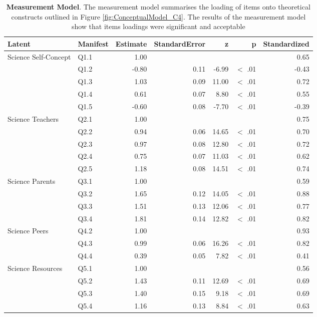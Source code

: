 \begin{landscape}
\begin{table}[ht]
\centering
\begin{tabular}{llrrrrr}
  \hline
Latent & Manifest & Estimate & StandardError & z & p & Standardized \\ 
  \hline
Science Self-Concept & Q1.1 & 1.00 &  &  &  & 0.65 \\ 
   & Q1.2 & -0.80 & 0.11 & -6.99 & $<$ .01 & -0.43 \\ 
   & Q1.3 & 1.03 & 0.09 & 11.00 & $<$ .01 & 0.72 \\ 
   & Q1.4 & 0.61 & 0.07 & 8.80 & $<$ .01 & 0.55 \\ 
   & Q1.5 & -0.60 & 0.08 & -7.70 & $<$ .01 & -0.39 \\ 
  Science Teachers & Q2.1 & 1.00 &  &  &  & 0.75 \\ 
   & Q2.2 & 0.94 & 0.06 & 14.65 & $<$ .01 & 0.70 \\ 
   & Q2.3 & 0.97 & 0.08 & 12.80 & $<$ .01 & 0.72 \\ 
   & Q2.4 & 0.75 & 0.07 & 11.03 & $<$ .01 & 0.62 \\ 
   & Q2.5 & 1.18 & 0.08 & 14.51 & $<$ .01 & 0.74 \\ 
  Science Parents & Q3.1 & 1.00 &  &  &  & 0.59 \\ 
   & Q3.2 & 1.65 & 0.12 & 14.05 & $<$ .01 & 0.88 \\ 
   & Q3.3 & 1.51 & 0.13 & 12.06 & $<$ .01 & 0.77 \\ 
   & Q3.4 & 1.81 & 0.14 & 12.82 & $<$ .01 & 0.82 \\ 
  Science Peers & Q4.2 & 1.00 &  &  &  & 0.93 \\ 
   & Q4.3 & 0.99 & 0.06 & 16.26 & $<$ .01 & 0.82 \\ 
   & Q4.4 & 0.39 & 0.05 & 7.82 & $<$ .01 & 0.41 \\ 
  Science Resources & Q5.1 & 1.00 &  &  &  & 0.56 \\ 
   & Q5.2 & 1.43 & 0.11 & 12.69 & $<$ .01 & 0.69 \\ 
   & Q5.3 & 1.40 & 0.15 & 9.18 & $<$ .01 & 0.69 \\ 
   & Q5.4 & 1.16 & 0.13 & 8.84 & $<$ .01 & 0.63 \\ 
   \hline
\end{tabular}
\caption{\textbf{Measurement Model}. The measurement model summarises the loading of items onto theoretical constructs outlined in Figure \ref{fig:ConceptualModel_C4}. The results of the measurement model show that items loadings were significant and acceptable}
\label{tab:MeasurementModel}       %
\end{table}
\end{landscape}

